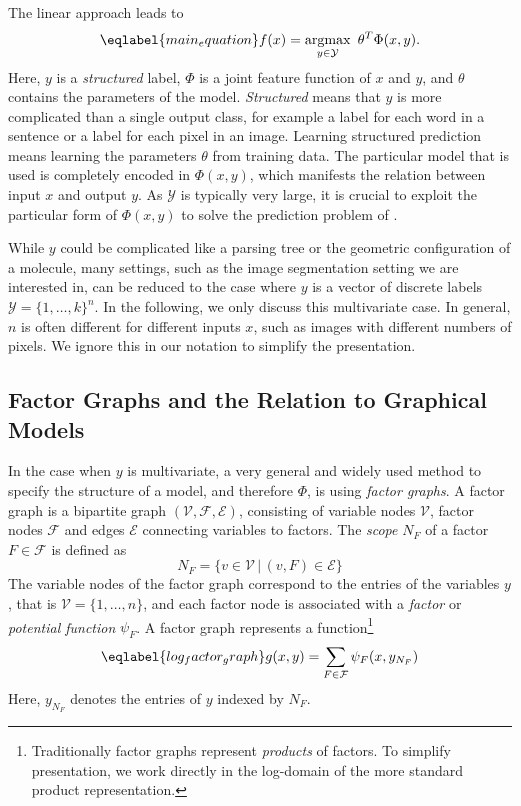 The linear approach leads to
\begin{equation}\eqlabel{main_equation}
    f(x) = \argmax_{y \in \mathcal{Y}}\  \theta^T \Phi(x, y).
\end{equation}
Here, $y$ is a \emph{structured} label, $\Phi$ is a joint feature function of
$x$ and $y$, and $\theta$ contains the parameters of the model. \emph{Structured} means
that $y$ is more complicated than a single output class, for example a label
for each word in a sentence or a label for each pixel in an image.
Learning structured prediction means learning the parameters $\theta$ from
training data.  The particular model that is used is completely encoded in
$\Phi(x, y)$, which manifests the relation between input $x$ and output $y$. As
$\mathcal{Y}$ is typically very large, it is crucial to exploit the particular
form of $\Phi(x, y)$ to solve the prediction problem of .

While $y$ could be complicated like a parsing tree or the geometric
configuration of a molecule, many settings, such as the image segmentation
setting we are interested in, can be reduced to the case where $y$ is a vector of
discrete labels $\mathcal{Y} = \{1, \dotsc, k\}^n$.
In the following, we only discuss this multivariate case. In general, $n$
is often different for different inputs $x$, such as images with different
numbers of pixels.  We ignore this in our notation to simplify the
presentation.

\subsection{Factor Graphs and the Relation to Graphical Models}
In the case when $y$ is multivariate, a very general and widely used method to
specify the structure of a model, and therefore $\Phi$, is using \emph{factor
graphs}. A factor graph is a bipartite graph $(\mathcal{V}, \mathcal{F},
\mathcal{E})$, consisting of variable nodes $\mathcal{V}$, factor nodes
$\mathcal{F}$ and edges $\mathcal{E}$ connecting variables to factors. The
\emph{scope} $N_F$ of a factor $F \in \mathcal{F}$ is defined as
\begin{equation}
    N_F = \{ v \in \mathcal{V} \,|\, (v,F) \in \mathcal{E} \}
\end{equation}
The variable nodes of the factor graph correspond to the entries of the
variables $y$, that is $\mathcal{V} = \{1, \dotsc, n\}$, and each factor node
is associated with a \emph{factor} or \emph{potential function} $\psi_F$.
A factor graph represents a function\footnote{Traditionally factor graphs
 represent \emph{products} of factors.  To simplify presentation, we work
directly in the log-domain of the more standard product representation.}
\begin{equation}\eqlabel{log_factor_graph}
    g(x, y) = \sum_{F \in \mathcal{F}} \psi_F(x, y_{N_F})
\end{equation}
Here, $y_{N_F}$ denotes the entries of $y$ indexed by $N_F$.

